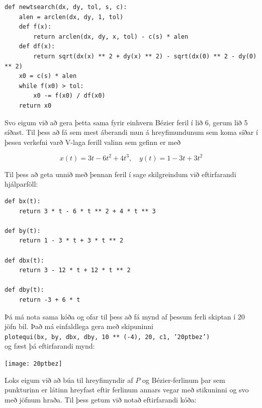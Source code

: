 \documentclass{article}
\begin{document}
\begin{verbatim}
def newtsearch(dx, dy, tol, s, c):
    alen = arclen(dx, dy, 1, tol)
    def f(x):
        return arclen(dx, dy, x, tol) - c(s) * alen
    def df(x):
        return sqrt(dx(x) ** 2 + dy(x) ** 2) - sqrt(dx(0) ** 2 - dy(0) ** 2)
    x0 = c(s) * alen
    while f(x0) > tol:
        x0 -= f(x0) / df(x0)
    return x0
\end{verbatim}

\vspace*{0.5cm}

Svo eigum við að gera þetta sama fyrir einhvern Bézier feril í lið 6, gerum lið 5 síðast. Til þess að fá sem mest áberandi mun á hreyfimundunum sem koma síðar í þessu verkefni varð V-laga ferill valinn sem gefinn er með

\[x(t) = 3t - 6t^2 + 4t^3, \quad y(t) = 1 - 3t + 3t^2\]

Til þess að geta unnið með þennan feril í sage skilgreindum við eftirfarandi hjálparföll: \\

\begin{verbatim}
def bx(t):
    return 3 * t - 6 * t ** 2 + 4 * t ** 3

def by(t):
    return 1 - 3 * t + 3 * t ** 2

def dbx(t):
    return 3 - 12 * t + 12 * t ** 2

def dby(t):
    return -3 + 6 * t
\end{verbatim}

\vspace*{0.5cm}

Þá má nota sama kóða og ofar til þess að fá mynd af þessum ferli skiptan í 20 jöfn bil. Það má einfaldlega gera með skipuninni \\ \texttt{plotequi(bx, by, dbx, dby, 10 ** (-4), 20, c1, '20ptbez')} \\ og fæst þá eftirfarandi mynd: \\

\begin{center}
\texttt{[image: 20ptbez]}
\end{center}

\vspace*{0.5cm}

Loks eigum við að búa til hreyfimyndir af $P$ og Bézier-ferlinum þar sem punkturinn er látinn hreyfast eftir ferlinum annars vegar með stikuninni og svo með jöfnum hraða. Til þess getum við notað eftirfarandi kóða: \\
\end{document}
